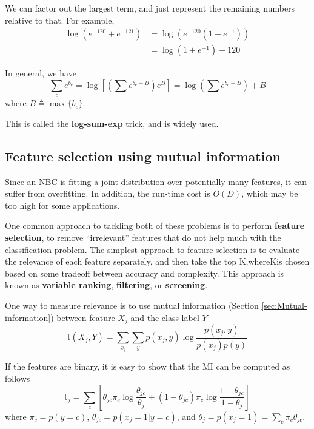 {We can factor out the largest term, and just represent the remaining numbers relative to that. For example,
\begin{equation}\begin{split}
\log(e^{-120}+e^{-121}) & =\log(e^{-120}(1+e^{-1})) \\
   & =\log(1+e^{-1})-120
\end{split}\end{equation}

In general, we have
\begin{equation}
\sum\limits_{c}e^{b_{c}}=\log\left[(\sum e^{b_c-B})e^B\right]=\log\left(\sum e^{b_c-B}\right)+B
\end{equation}
where $B \triangleq \max\{b_c\}$.

This is called the \textbf{log-sum-exp} trick, and is widely used. 


\subsection{Feature selection using mutual information}
Since an NBC is fitting a joint distribution over potentially many features, it can suffer from overfitting. In addition, the run-time cost is $O(D)$, which may be too high for some applications. 

One common approach to tackling both of these problems is to perform \textbf{feature selection}, to remove “irrelevant” features that do not help much with the classification problem. The simplest approach to feature selection is to evaluate the relevance of each feature separately, and then take the top K,whereKis chosen based on some tradeoff between accuracy and complexity. This approach is known as \textbf{variable ranking}, \textbf{filtering}, or \textbf{screening}.

One way to measure relevance is to use mutual information (Section \ref{sec:Mutual-information}) between feature $X_j$ and the class label $Y$
\begin{equation}
\mathbb{I}(X_j,Y)=\sum\limits_{x_j}{\sum\limits_{y}{p(x_j,y)\log \dfrac{p(x_j,y)}{p(x_j)p(y)}}}
\end{equation}

If the features are binary, it is easy to show that the MI can be computed as follows
\begin{equation}
\mathbb{I}_j = \sum\limits_c \left[\theta_{jc}\pi_c\log{\dfrac{\theta_{jc}}{\theta_j}}+(1-\theta_{jc})\pi_c\log{\dfrac{1-\theta_{jc}}{1-\theta_j}}\right]
\end{equation}
where $\pi_c=p(y=c)$, $\theta_{jc}=p(x_j=1|y=c)$, and $\theta_j=p(x_j=1)=\sum_{c} \pi_c\theta_{jc}$.


}

